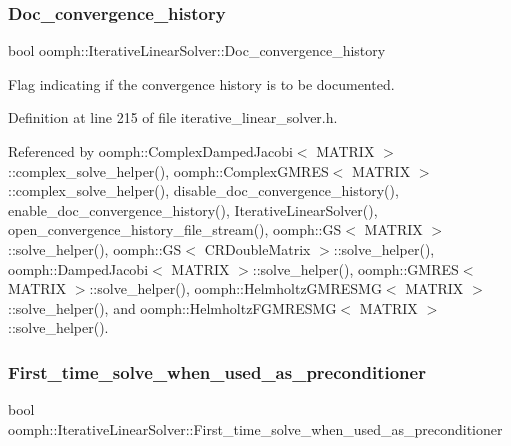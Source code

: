 \subsubsection{\texorpdfstring{Doc\+\_\+convergence\+\_\+history}{Doc\_convergence\_history}}
{\footnotesize\ttfamily bool oomph\+::\+Iterative\+Linear\+Solver\+::\+Doc\+\_\+convergence\+\_\+history\hspace{0.3cm}{\ttfamily [protected]}}



Flag indicating if the convergence history is to be documented. 



Definition at line 215 of file iterative\+\_\+linear\+\_\+solver.\+h.



Referenced by oomph\+::\+Complex\+Damped\+Jacobi$<$ M\+A\+T\+R\+I\+X $>$\+::complex\+\_\+solve\+\_\+helper(), oomph\+::\+Complex\+G\+M\+R\+E\+S$<$ M\+A\+T\+R\+I\+X $>$\+::complex\+\_\+solve\+\_\+helper(), disable\+\_\+doc\+\_\+convergence\+\_\+history(), enable\+\_\+doc\+\_\+convergence\+\_\+history(), Iterative\+Linear\+Solver(), open\+\_\+convergence\+\_\+history\+\_\+file\+\_\+stream(), oomph\+::\+G\+S$<$ M\+A\+T\+R\+I\+X $>$\+::solve\+\_\+helper(), oomph\+::\+G\+S$<$ C\+R\+Double\+Matrix $>$\+::solve\+\_\+helper(), oomph\+::\+Damped\+Jacobi$<$ M\+A\+T\+R\+I\+X $>$\+::solve\+\_\+helper(), oomph\+::\+G\+M\+R\+E\+S$<$ M\+A\+T\+R\+I\+X $>$\+::solve\+\_\+helper(), oomph\+::\+Helmholtz\+G\+M\+R\+E\+S\+M\+G$<$ M\+A\+T\+R\+I\+X $>$\+::solve\+\_\+helper(), and oomph\+::\+Helmholtz\+F\+G\+M\+R\+E\+S\+M\+G$<$ M\+A\+T\+R\+I\+X $>$\+::solve\+\_\+helper().

\mbox{\label{classoomph_1_1IterativeLinearSolver_a18f24e4d07f783ddd1f6a8153f39024a}} 
\subsubsection{\texorpdfstring{First\+\_\+time\+\_\+solve\+\_\+when\+\_\+used\+\_\+as\+\_\+preconditioner}{First\_time\_solve\_when\_used\_as\_preconditioner}}
{\footnotesize\ttfamily bool oomph\+::\+Iterative\+Linear\+Solver\+::\+First\+\_\+time\+\_\+solve\+\_\+when\+\_\+used\+\_\+as\+\_\+preconditioner\hspace{0.3cm}{\ttfamily [protected]}}

